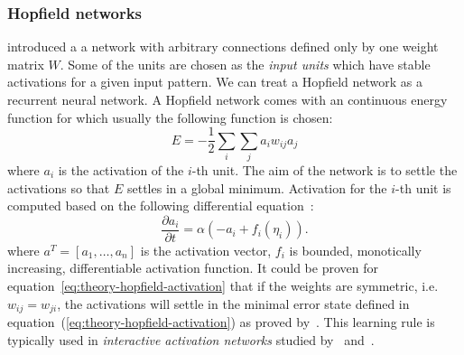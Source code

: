 \subsubsection{Hopfield networks}
\label{sec:theory-hopfield}

\citet{hopfield1984neurons} introduced a a network with arbitrary connections defined only by one weight matrix $W$. Some of the units are chosen as the \emph{input units} which have stable activations for a given input pattern. We can treat a Hopfield network as a recurrent neural network. A Hopfield network comes with an continuous energy function for which usually the following function is chosen: 
\begin{equation}
  \label{eq:theory-hopfield-energy}
  E = -\frac{1}{2}\sum_i\sum_ja_iw_{ij}a_j
\end{equation} 
where $a_i$ is the activation of the $i$-th unit. The aim of the network is to settle the activations so that $E$ settles in a global minimum. Activation for the $i$-th unit is computed based on the following differential equation~\citep{hopfield1984neurons}: 
\begin{equation}
  \label{eq:theory-hopfield-activation}
  \frac{\partial a_i}{\partial t} = \alpha(-a_i + f_i(\eta_i)).
\end{equation} 
where $a^T = [a_1,\ldots,a_n]$ is the activation vector, $f_i$ is bounded, monotically increasing, differentiable activation function. It could be proven for equation~\ref{eq:theory-hopfield-activation} that if the weights are symmetric, i.e. $w_{ij} = w_{ji}$, the activations will settle in the minimal error state defined in equation~(\ref{eq:theory-hopfield-activation}) as proved by~\citet{hopfield1984neurons}. This learning rule is typically used in \emph{interactive activation networks} studied by~\citet{grossberg1978theory} and~\citet{mcclelland1981interactive}. 

